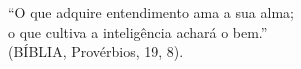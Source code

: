 \begin{epigrafe}
  \vspace*{\fill}
	\begin{flushright}
    ``O que adquire entendimento ama a sua alma; \\
        o que cultiva a inteligência achará o bem.''\\
    (BÍBLIA, Provérbios, 19, 8).
	\end{flushright}
\end{epigrafe}
